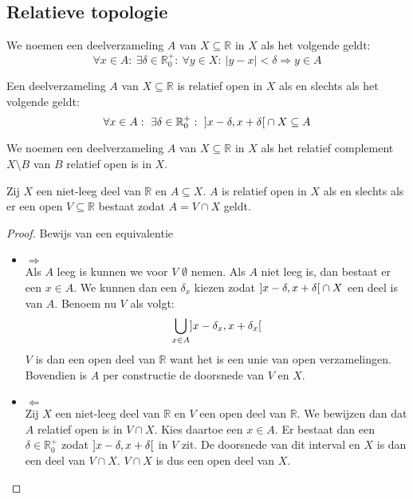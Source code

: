 \documentclass[main.tex]{subfiles}
\begin{document}
\subsection{Relatieve topologie}
\label{sec:relatieve-topologie}

\begin{de}
  We noemen een deelverzameling $A$ van $X\subseteq \mathbb{R}$  in $X$ als het volgende geldt:
  \[ \forall x\in A:\ \exists \delta \in \mathbb{R}_{0}^{+}:\ \forall y\in X:\ |y-x| < \delta \Rightarrow y \in A \]
\end{de}

\begin{st}
  Een  deelverzameling $A$ van $X\subseteq \mathbb{R}$  is relatief open in $X$ als en slechts als het volgende geldt:
  \[ \forall x\in A:\ \exists \delta\in \mathbb{R}_{0}^{+}:\ \interval[open]{x-\delta}{x+\delta} \cap X \subseteq A \]
\end{st}

\begin{de}
  We noemen een deelverzameling $A$ van $X\subseteq \mathbb{R}$  in $X$ als het relatief complement $X\setminus B$ van $B$ relatief open is in $X$.
\end{de}

\begin{pr}
  Zij $X$ een niet-leeg deel van $\mathbb{R}$ en $A \subseteq X$.
  $A$ is relatief open in $X$ als en slechts als er een open $V\subseteq \mathbb{R}$ bestaat zodat $A=V \cap X$ geldt.

  \begin{proof}
    Bewijs van een equivalentie\\
    \begin{itemize}
    \item $\Rightarrow$\\
      Als $A$ leeg is kunnen we voor $V$ $\emptyset$ nemen.
      Als $A$ niet leeg is, dan bestaat er een $x\in A$.
      We kunnen dan een $\delta_{x}$ kiezen zodat $\interval[open]{x-\delta}{x+\delta} \cap X$ een deel is van $A$.
      Benoem nu $V$ als volgt:
      \[ \bigcup_{x\in A}\interval[open]{x-\delta_{x}}{x+\delta_{x}} \]
      $V$ is dan een open deel van $\mathbb{R}$ want het is een unie van open verzamelingen.
      Bovendien is $A$ per constructie de doorsnede van $V$ en $X$.
    \item $\Leftarrow$\\
      Zij $X$ een niet-leeg deel van $\mathbb{R}$ en $V$ een open deel van $\mathbb{R}$.
      We bewijzen dan dat $A$ relatief open is in $V\cap X$.
      Kies daartoe een $x\in A$. Er bestaat dan een $\delta\in \mathbb{R}_{0}^{+}$ zodat $\interval[open]{x-\delta}{x+\delta}$ in $V$ zit.
      De doorsnede van dit interval en $X$ is dan een deel van $V \cap X$.
      $V\cap X$ is dus een open deel van $X$.
    \end{itemize}
  \end{proof}
\end{pr}
\end{document}
